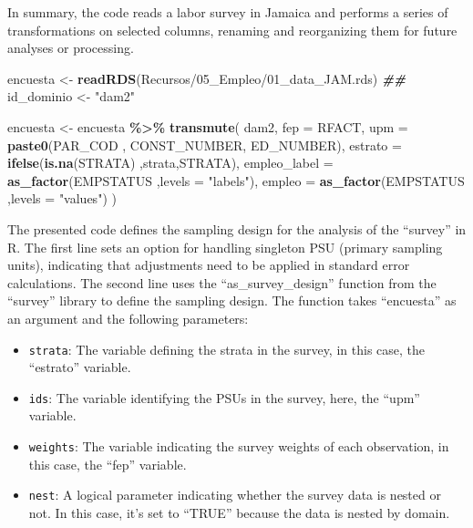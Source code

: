 \documentclass[
  12pt,
]{book}
\newenvironment{Shaded}{\begin{snugshade}}{\end{snugshade}}
\newcommand{\AttributeTok}[1]{\textcolor[rgb]{0.13,0.29,0.53}{#1}}
\newcommand{\DocumentationTok}[1]{\textcolor[rgb]{0.56,0.35,0.01}{\textbf{\textit{#1}}}}
\newcommand{\FunctionTok}[1]{\textcolor[rgb]{0.13,0.29,0.53}{\textbf{#1}}}
\newcommand{\NormalTok}[1]{#1}
\newcommand{\OtherTok}[1]{\textcolor[rgb]{0.56,0.35,0.01}{#1}}
\newcommand{\SpecialCharTok}[1]{\textcolor[rgb]{0.81,0.36,0.00}{\textbf{#1}}}
\newcommand{\StringTok}[1]{\textcolor[rgb]{0.31,0.60,0.02}{#1}}
\begin{document}
In summary, the code reads a labor survey in Jamaica and performs a series of transformations on selected columns, renaming and reorganizing them for future analyses or processing.

\begin{Shaded}
\begin{Highlighting}[]
\NormalTok{encuesta }\OtherTok{\textless{}{-}} \FunctionTok{readRDS}\NormalTok{(}\StringTok{\textquotesingle{}Recursos/05\_Empleo/01\_data\_JAM.rds\textquotesingle{}}\NormalTok{)}
\DocumentationTok{\#\# }
\NormalTok{id\_dominio }\OtherTok{\textless{}{-}} \StringTok{"dam2"}

\NormalTok{encuesta }\OtherTok{\textless{}{-}}
\NormalTok{  encuesta }\SpecialCharTok{\%\textgreater{}\%}
  \FunctionTok{transmute}\NormalTok{(}
\NormalTok{    dam2,}
    \AttributeTok{fep =}\NormalTok{ RFACT,}
    \AttributeTok{upm =} \FunctionTok{paste0}\NormalTok{(PAR\_COD , CONST\_NUMBER, ED\_NUMBER),}
    \AttributeTok{estrato =} \FunctionTok{ifelse}\NormalTok{(}\FunctionTok{is.na}\NormalTok{(STRATA) ,strata,STRATA),}
    \AttributeTok{empleo\_label =} \FunctionTok{as\_factor}\NormalTok{(EMPSTATUS ,}\AttributeTok{levels  =} \StringTok{"labels"}\NormalTok{),}
    \AttributeTok{empleo =} \FunctionTok{as\_factor}\NormalTok{(EMPSTATUS ,}\AttributeTok{levels  =} \StringTok{"values"}\NormalTok{) }
\NormalTok{  )}
\end{Highlighting}
\end{Shaded}

The presented code defines the sampling design for the analysis of the ``survey'' in R. The first line sets an option for handling singleton PSU (primary sampling units), indicating that adjustments need to be applied in standard error calculations. The second line uses the ``as\_survey\_design'' function from the ``survey'' library to define the sampling design. The function takes ``encuesta'' as an argument and the following parameters:

\begin{itemize}
\item
  \texttt{strata}: The variable defining the strata in the survey, in this case, the ``estrato'' variable.
\item
  \texttt{ids}: The variable identifying the PSUs in the survey, here, the ``upm'' variable.
\item
  \texttt{weights}: The variable indicating the survey weights of each observation, in this case, the ``fep'' variable.
\item
  \texttt{nest}: A logical parameter indicating whether the survey data is nested or not. In this case, it's set to ``TRUE'' because the data is nested by domain.
\end{itemize}
\end{document}
